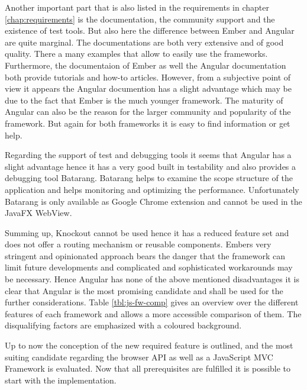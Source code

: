 Another important part that is also listed in the requirements in chapter \ref{chap:requirements} is the documentation, the community support and the existence of test tools. 
But also here the difference between Ember and Angular are quite marginal. 
The documentations are both very extensive and of good quality. 
There a many examples that allow to easily use the frameworks. 
Furthermore, the documentaion of  Ember as well the Angular documentation both provide tutorials and how-to articles. 
However, from a subjective point of view it appears the Angular documention has a slight advantage which may be due to the fact that Ember is the much younger framework. 
The maturity of Angular can also be the reason for the larger community and popularity of the framework. 
But again for both frameworks it is easy to find information or get help. 

Regarding the support of test and debugging tools it seems that Angular has a slight advantage hence it has a very good built in testability and also provides a debugging tool Batarang.
Batarang helps to examine the scope structure of the application and helps monitoring and optimizing the performance. 
Unfortunately Batarang is only available as Google Chrome extension and cannot be used in the JavaFX WebView.

Summing up, Knockout cannot be used hence it has a reduced feature set and does not offer a routing mechanism or reusable components. 
Embers very stringent and opinionated approach bears the danger that the framework can limit future developments and complicated and sophisticated workarounds may be necessary. 
Hence Angular has none of the above mentioned disadvantages it is clear that Angular is the most promising candidate and shall be used for the further considerations. 
Table \ref{tbl:js-fw-comp} gives an overview over the different features of each framework and allows a more accessible comparison of them. 
The disqualifying factors are emphasized with a coloured background. 

Up to now the conception of the new required feature is outlined, and the most suiting candidate regarding the browser API as well as a JavaScript MVC Framework is evaluated. 
Now that all prerequisites are fulfilled it is possible to start with the implementation.

